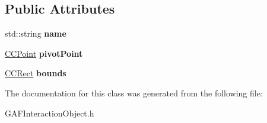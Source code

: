 \subsection*{Public Attributes}
\begin{DoxyCompactItemize}
\item 
\hypertarget{class_g_a_f_1_1_g_a_f_interaction_object_a0086984dff9589d8d3c287039648ea13}{std\-::string {\bfseries name}}\label{class_g_a_f_1_1_g_a_f_interaction_object_a0086984dff9589d8d3c287039648ea13}

\item 
\hypertarget{class_g_a_f_1_1_g_a_f_interaction_object_a4f8c3543199eeacf9264e82bfba44b5c}{\hyperlink{class_g_a_f_1_1_c_c_point}{C\-C\-Point} {\bfseries pivot\-Point}}\label{class_g_a_f_1_1_g_a_f_interaction_object_a4f8c3543199eeacf9264e82bfba44b5c}

\item 
\hypertarget{class_g_a_f_1_1_g_a_f_interaction_object_a18458d08193fd96a8b189e5bd7543c61}{\hyperlink{class_g_a_f_1_1_c_c_rect}{C\-C\-Rect} {\bfseries bounds}}\label{class_g_a_f_1_1_g_a_f_interaction_object_a18458d08193fd96a8b189e5bd7543c61}

\end{DoxyCompactItemize}


The documentation for this class was generated from the following file\-:\begin{DoxyCompactItemize}
\item 
G\-A\-F\-Interaction\-Object.\-h\end{DoxyCompactItemize}
